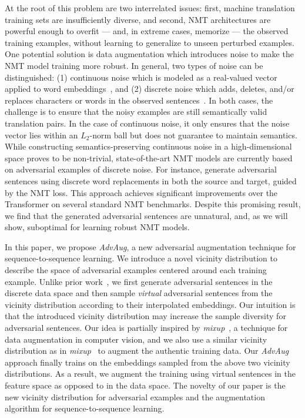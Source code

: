 \documentclass[11pt,a4paper]{article}
\newcommand{\fancyname}{AdvAug}
\newcommand{\mixup}{\textit{mixup}\xspace}
\begin{document}
At the root of this problem are two interrelated issues: first, machine translation training sets are insufficiently diverse, and second, NMT architectures are powerful enough to overfit --- and, in extreme cases, memorize --- the observed training examples, without learning to generalize to unseen perturbed examples.
One potential solution is data augmentation which introduces noise to make the NMT model training more robust.
In general, two types of noise can be distinguished: (1) continuous noise which is modeled as a real-valued vector applied to word embeddings~\cite{Miyato:15,Miyato:17,Cheng:18,Sano:19}, and (2) discrete noise which adds, deletes, and/or replaces characters or words in the observed sentences~\cite{Belinkov:17, Sperber:17, Ebrahimi:18b, Michel:19, Cheng:19, Karpukhin:19}. In both cases, the challenge is to ensure that the noisy examples are still semantically valid translation pairs.
In the case of continuous noise, it only ensures that the noise vector lies within an $L_2$-norm ball but does not guarantee to maintain semantics.
While constructing semantics-preserving continuous noise in a high-dimensional space proves to be non-trivial, state-of-the-art NMT models are currently based on adversarial examples of discrete noise.
For instance, \citet{Cheng:19} generate adversarial sentences using discrete word replacements in both the source and target, guided by the NMT loss. This approach achieves significant improvements over the Transformer on several standard NMT benchmarks.
Despite this promising result, we find that the generated adversarial sentences are unnatural, and, as we will show, suboptimal for learning robust NMT models.



In this paper, we propose {\em \fancyname}, a new adversarial augmentation technique for sequence-to-sequence learning. We introduce a novel vicinity distribution to describe the space of adversarial examples centered around each training example. Unlike prior work~\cite{Cheng:19}, we first generate adversarial sentences in the discrete data space and then sample \emph{virtual} adversarial sentences from the vicinity distribution according to their interpolated embeddings. Our intuition is that the introduced vicinity distribution may increase the sample diversity for adversarial sentences. Our idea is partially inspired by \mixup~\cite{Zhang:18}, a technique for data augmentation in computer vision, and we also use a similar vicinity distribution as in \mixup~ to augment the authentic training data.
Our {\em \fancyname} approach finally trains on the embeddings sampled from the above two vicinity distributions. As a result, we augment the training using virtual sentences in the feature space as opposed to in the data space. The novelty of our paper is the new vicinity distribution for adversarial examples and the augmentation algorithm for sequence-to-sequence learning.
\end{document}
